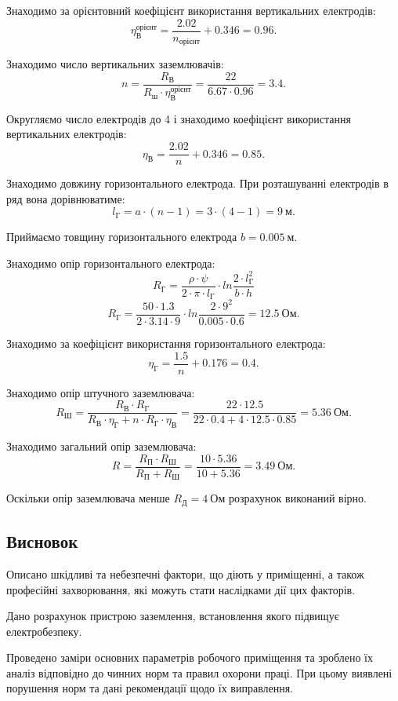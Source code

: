 \documentclass[a4paper,12pt]{article}
\begin{document}
Знаходимо за \cite{dzunzuk} орієнтовний коефіцієнт використання вертикальних електродів:
\[
\eta_\text{В}^\text{орієнт} = \frac{2.02}{n_\text{орієнт}} + 0.346 = 0.96.
\]

Знаходимо число вертикальних заземлювачів:
\[
n = \frac{R_\text{В}}{R_\text{ш}\cdot \eta_\text{В}^\text{орієнт}} = \frac{22}{6.67\cdot 0.96} = 3.4.
\]

Округляємо число електродів до 4 і знаходимо коефіцієнт використання вертикальних електродів:
\[
\eta_\text{В} = \frac{2.02}{n} + 0.346 = 0.85.
\]

Знаходимо довжину горизонтального електрода. При розташуванні електродів в ряд вона дорівнюватиме:
\[
l_\text{Г} = a \cdot (n - 1) = 3 \cdot (4 - 1) = 9\ \text{м}.
\]

Приймаємо товщину горизонтального електрода $b = 0.005\ \text{м}$.

Знаходимо опір горизонтального електрода:
\[
R_\text{Г} = \frac{\rho \cdot \psi}{2 \cdot \pi \cdot l_\text{Г}} \cdot ln \frac{2 \cdot l_\text{Г}^2}{b \cdot h}
\]
\[
R_\text{Г} = \frac{50 \cdot 1.3}{2 \cdot 3.14 \cdot 9} \cdot ln \frac{2 \cdot 9^2}{0.005 \cdot 0.6} = 12.5\ \text{Ом}.
\]

Знаходимо за \cite{dzunzuk} коефіцієнт використання горизонтального електрода:
\[
\eta_\text{Г} = \frac{1.5}{n} + 0.176 = 0.4.
\]

Знаходимо опір штучного заземлювача:
\[
R_\text{Ш} = \frac{R_\text{В} \cdot R_\text{Г}}{R_\text{В} \cdot \eta_\text{Г} + n \cdot R_\text{Г} \cdot \eta_\text{В}} = \frac{22 \cdot 12.5}{22 \cdot 0.4 + 4 \cdot 12.5 \cdot 0.85} = 5.36\ \text{Ом}.
\]

Знаходимо загальний опір заземлювача:
\[
R = \frac{R_\text{П} \cdot R_\text{Ш}}{R_\text{П} + R_\text{Ш}} = \frac{10 \cdot 5.36}{10 + 5.36} = 3.49\ \text{Ом}.
\]

Оскільки опір заземлювача менше $R_\text{Д}=4\ \text{Ом}$ розрахунок виконаний вірно.

\subsection{Висновок}
Описано шкідливі та небезпечні фактори, що діють у приміщенні, а також професійні захворювання, які можуть стати наслідками дії цих факторів.

Дано розрахунок пристрою заземлення, встановлення якого підвищує електробезпеку.

Проведено заміри основних параметрів робочого приміщення та зроблено їх аналіз відповідно до чинних норм та правил охорони праці. При цьому виявлені порушення норм та дані рекомендації щодо їх виправлення.
\end{document}
